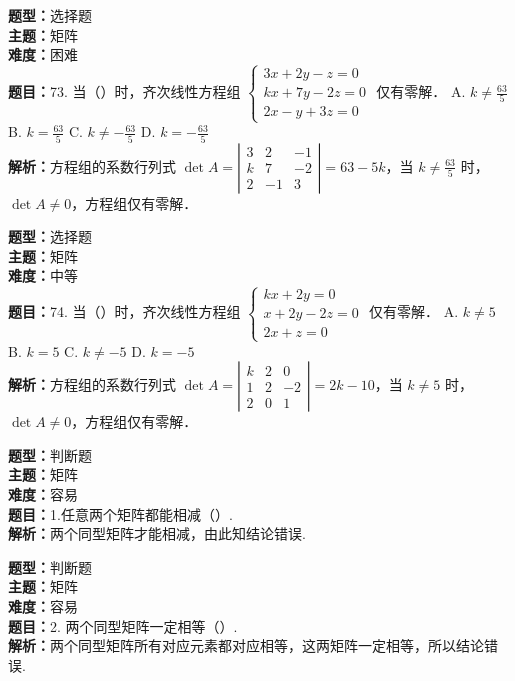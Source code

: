 \documentclass{ctexart}
\newenvironment{question}[5]{%
	\noindent\textbf{题型：}#1\\
	\textbf{主题：}#2\\
	\textbf{难度：}#3\\
	\textbf{题目：}#4\\
	\textbf{解析：}#5\\
	\vspace{1em}
}{}
\begin{document}
	\begin{question}
		{选择题}
		{矩阵}
		{困难}
		{73. 当（）时，齐次线性方程组 \(\left\{\begin{array}{c}3 x+2 y-z=0 \\ k x+7 y-2 z=0 \\ 2 x-y+3 z=0\end{array}\right.\) 仅有零解．
			A. \(k \neq \frac{63}{5}\)
			B. \(k=\frac{63}{5}\)
			C. \(k \neq-\frac{63}{5}\)
			D. \(k=-\frac{63}{5}\)}
		{方程组的系数行列式 \(\operatorname{det} A=\left|\begin{array}{ccc}3 & 2 & -1 \\ k & 7 & -2 \\ 2 & -1 & 3\end{array}\right|=63-5 k\)，当 \(k \neq \frac{63}{5}\) 时，\(\operatorname{det} A \neq 0\)，方程组仅有零解．}
	\end{question}
	
	\begin{question}
		{选择题}
		{矩阵}
		{中等}
		{74. 当（）时，齐次线性方程组 \(\left\{\begin{array}{l}k x+2 y=0 \\ x+2 y-2 z=0 \\ 2 x+z=0\end{array}\right.\) 仅有零解．
			A. \(k \neq 5\)
			B. \(k=5\)
			C. \(k \neq-5\)
			D. \(k=-5\)}
		{方程组的系数行列式 \(\operatorname{det} A=\left|\begin{array}{ccc}k & 2 & 0 \\ 1 & 2 & -2 \\ 2 & 0 & 1\end{array}\right|=2 k-10\)，当 \(k \neq 5\) 时，\(\operatorname{det} A \neq 0\)，方程组仅有零解．}
	\end{question}
	
	
	
	
	\begin{question}
		{判断题}
		{矩阵}
		{容易}
		{1.任意两个矩阵都能相减（）.}
		{两个同型矩阵才能相减，由此知结论错误.}
	\end{question}
	
	\begin{question}
		{判断题}
		{矩阵}
		{容易}
		{2. 两个同型矩阵一定相等（）.}
		{两个同型矩阵所有对应元素都对应相等，这两矩阵一定相等，所以结论错误.}
	\end{question}
	
\end{document}
